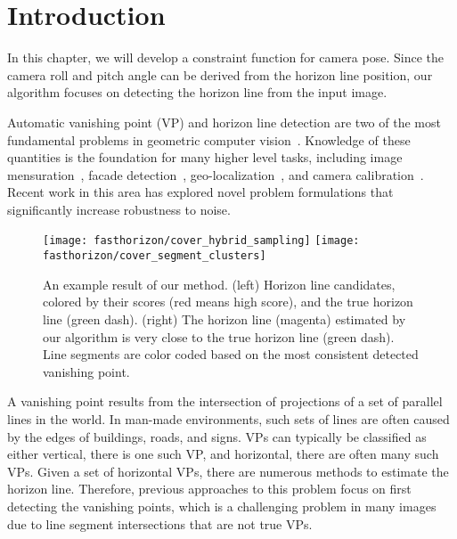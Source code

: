 \section{Introduction}

In this chapter, we will develop a constraint function for
camera pose. Since the camera roll and pitch angle can be derived from
the horizon line position, our algorithm focuses on detecting the
horizon line from the input image.

Automatic vanishing point (VP) and horizon line detection are two of
the most fundamental problems in geometric computer
vision~\cite{barnard1983interpreting,magee1984determining}. Knowledge
of these quantities is the foundation for many higher level
tasks, including image mensuration~\cite{criminisi2000single},
facade detection~\cite{liulocal2014},
geo-localization~\cite{baatz2010handling,workman2014rainbow}, and
camera
calibration~\cite{autorecovery2000,grammatikopoulos2007automatic,
jacobs13cloudcalibration,videocampass2002}. Recent work in this area
\cite{global2013,wildenauer2012,kitware2013} has explored novel
problem formulations that significantly increase robustness to noise.

\begin{figure}
  \centering
  \texttt{[image: fasthorizon/cover\_hybrid\_sampling]}
  \hfill
  \texttt{[image: fasthorizon/cover\_segment\_clusters]}

  \caption{An example result of our method. (left) Horizon line
    candidates, colored by their scores (red means high score), and
    the true horizon line (green dash). (right) The horizon line
    (magenta) estimated by our algorithm is very close to the true
    horizon line (green dash).  Line segments are color coded based on
    the most consistent detected vanishing point.}

  \label{fig:cover}
\end{figure}

A vanishing point results from the intersection of projections of a
set of parallel lines in the world. In man-made environments, such
sets of lines are often caused by the edges of buildings, roads, and
signs. VPs can typically be classified as either vertical, there is
one such VP, and horizontal, there are often many such VPs.  Given a
set of horizontal VPs, there are numerous methods to estimate the
horizon line.  Therefore, previous approaches to this problem focus on
first detecting the vanishing points, which is a challenging problem
in many images due to line segment intersections that are not true
VPs.


